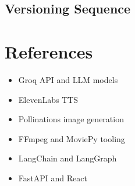 \documentclass[11pt]{article}
\begin{document}
\subsection{Versioning Sequence}

\section*{References}
\begin{itemize}
  \item Groq API and LLM models
  \item ElevenLabs TTS
  \item Pollinations image generation
  \item FFmpeg and MoviePy tooling
  \item LangChain and LangGraph
  \item FastAPI and React
\end{itemize}
\end{document}
